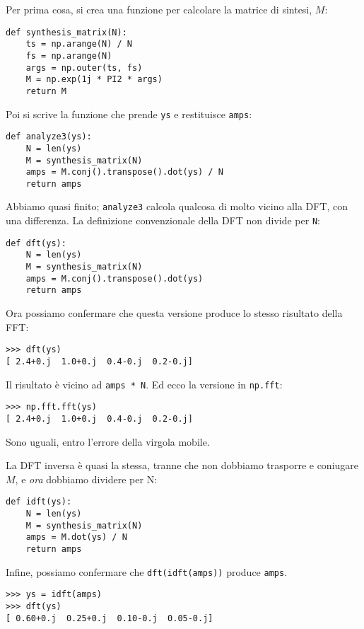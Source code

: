 \documentclass[12pt,a4paper]{book}
\begin{document}
Per prima cosa, si crea una funzione per calcolare la matrice di sintesi, $M$:

\begin{verbatim} 
def synthesis_matrix(N):
    ts = np.arange(N) / N
    fs = np.arange(N)
    args = np.outer(ts, fs)
    M = np.exp(1j * PI2 * args)
    return M
 \end{verbatim} 

Poi si scrive la funzione che prende {\tt ys} e restituisce {\tt amps}:

\begin{verbatim} 
def analyze3(ys):
    N = len(ys)
    M = synthesis_matrix(N)
    amps = M.conj().transpose().dot(ys) / N
    return amps
 \end{verbatim} 

Abbiamo quasi finito; {\tt analyze3} calcola qualcosa di molto vicino alla DFT, con una differenza. La definizione convenzionale della DFT non divide per {\tt N}:

\begin{verbatim} 
def dft(ys):
    N = len(ys)
    M = synthesis_matrix(N)
    amps = M.conj().transpose().dot(ys)
    return amps
 \end{verbatim} 

Ora possiamo confermare che questa versione produce lo stesso risultato della FFT:

\begin{verbatim} 
>>> dft(ys)
[ 2.4+0.j  1.0+0.j  0.4-0.j  0.2-0.j]
 \end{verbatim} 

Il risultato è vicino ad {\tt amps * N}. Ed ecco la versione in {\tt np.fft}:

\begin{verbatim} 
>>> np.fft.fft(ys)
[ 2.4+0.j  1.0+0.j  0.4-0.j  0.2-0.j]
 \end{verbatim} 

Sono uguali, entro l'errore della virgola mobile.

La DFT inversa è quasi la stessa, tranne che non dobbiamo trasporre e coniugare $M$, e {\em ora} dobbiamo dividere per N:

\begin{verbatim} 
def idft(ys):
    N = len(ys)
    M = synthesis_matrix(N)
    amps = M.dot(ys) / N
    return amps
 \end{verbatim} 

Infine, possiamo confermare che {\tt dft(idft(amps))} produce {\tt amps}.

\begin{verbatim} 
>>> ys = idft(amps)
>>> dft(ys)
[ 0.60+0.j  0.25+0.j  0.10-0.j  0.05-0.j]
 \end{verbatim} 
\end{document}
